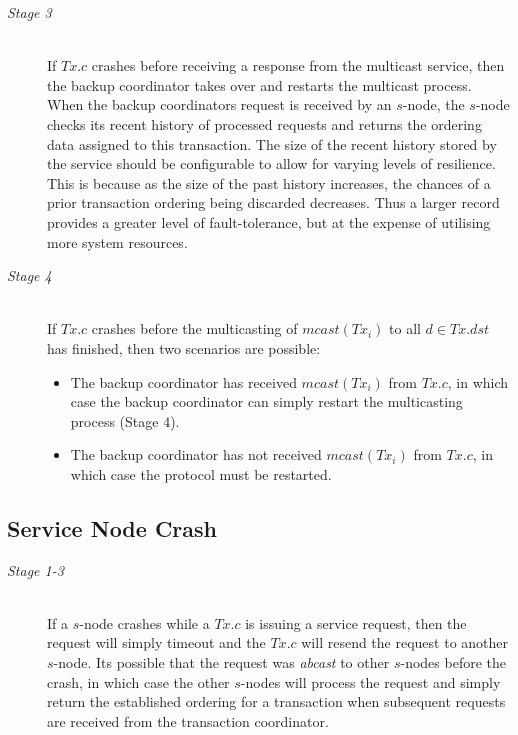 \begin{description}
        \item[\emph{Stage 3}]  \hfill \\
        If $Tx.c$ crashes before receiving a response from the multicast service, then the backup coordinator takes over and restarts the multicast process.  When the backup coordinators request is received by an $s$-node, the $s$-node checks its recent history of processed requests and returns the ordering data assigned to this transaction.  The size of the recent history stored by the service should be configurable to allow for varying levels of resilience.   This is because as the size of the past history increases, the chances of a prior transaction ordering being discarded decreases.  Thus a larger record provides a greater level of fault-tolerance, but at the expense of utilising more system resources.  
        
        \item[\emph{Stage 4}]  \hfill \\
        If $Tx.c$ crashes before the multicasting of $mcast(Tx_i)$ to all $d \in Tx.dst$ has finished, then two scenarios are possible:
           \begin{itemize}
			    \item    The backup coordinator has received $mcast(Tx_i)$ from $Tx.c$, in which case the backup coordinator can simply restart the multicasting process (Stage 4).
			    \item    The backup coordinator has not received $mcast(Tx_i)$ from $Tx.c$, in which case the protocol must be restarted.  
		    \end{itemize}  
    \end{description}
    
	\subsection*{Service Node Crash}
	\begin{description}
       \item[\emph{Stage 1-3}] \hfill \\
       If a $s$-node crashes while a $Tx.c$ is issuing a service request, then the request will simply timeout and the $Tx.c$ will resend the request to another $s$-node.  Its possible that the request was \emph{abcast} to other $s$-nodes before the crash, in which case the other $s$-nodes will process the request and simply return the established ordering for a transaction when subsequent requests are received from the transaction coordinator.  
    \end{description}

